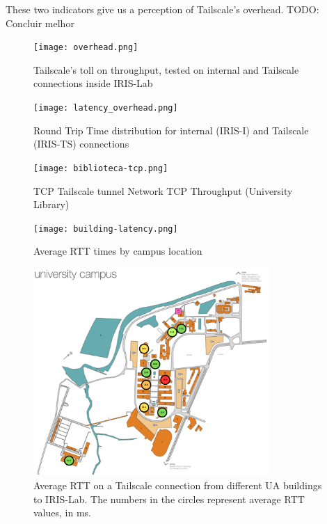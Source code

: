 \documentclass[11pt,twoside,a4paper]{report}
\begin{document}
These two indicators give us a perception of Tailscale's overhead. TODO: Concluir melhor

\begin{figure}[h]
\centering
  \texttt{[image: overhead.png]}
  \caption{Tailscale's toll on throughput, tested on internal and Tailscale connections inside IRIS-Lab}
  \label{fig:overhead}
\end{figure}

\begin{figure}[h]
\centering
  \texttt{[image: latency\_overhead.png]}
  \caption{Round Trip Time distribution for internal (IRIS-I) and Tailscale (IRIS-TS) connections}
  \label{fig:latency_overhead}
\end{figure}

\begin{figure}[h]
\centering
  \texttt{[image: biblioteca-tcp.png]}
  \caption{TCP Tailscale tunnel Network TCP Throughput (University Library)}
  \label{fig:tcptplibrary}
\end{figure}


\begin{figure}[h]
\centering
  \texttt{[image: building-latency.png]}
  \caption{Average RTT times by campus location}
  \label{fig:buildlat}
\end{figure}


\begin{figure}[h]
\centering
\includegraphics[width=0.8\textwidth]{ua-latency.png}
\caption{Average RTT on a Tailscale connection from different UA buildings to IRIS-Lab. The numbers in the circles represent average RTT values, in ms.}
\label{fig:ualats}
\end{figure}
\end{document}
